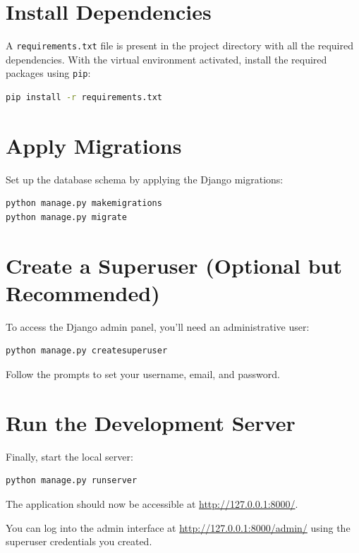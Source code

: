 \section{Install Dependencies}
A \texttt{requirements.txt} file is present in the project directory with all the required dependencies.
With the virtual environment activated, install the required packages using \texttt{pip}:
\begin{lstlisting}[language=bash]
pip install -r requirements.txt
\end{lstlisting}

\section{Apply Migrations}
Set up the database schema by applying the Django migrations:
\begin{lstlisting}[language=bash]
python manage.py makemigrations
python manage.py migrate
\end{lstlisting}

\section{Create a Superuser (Optional but Recommended)}
To access the Django admin panel, you'll need an administrative user:
\begin{lstlisting}[language=bash]
python manage.py createsuperuser
\end{lstlisting}
Follow the prompts to set your username, email, and password.

\section{Run the Development Server}
Finally, start the local server:
\begin{lstlisting}[language=bash]
python manage.py runserver
\end{lstlisting}
The application should now be accessible at \url{http://127.0.0.1:8000/}.

You can log into the admin interface at \url{http://127.0.0.1:8000/admin/} using the superuser credentials you created.

